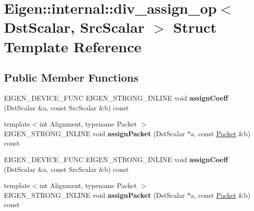 \hypertarget{struct_eigen_1_1internal_1_1div__assign__op}{}\section{Eigen\+:\+:internal\+:\+:div\+\_\+assign\+\_\+op$<$ Dst\+Scalar, Src\+Scalar $>$ Struct Template Reference}
\label{struct_eigen_1_1internal_1_1div__assign__op}
\subsection*{Public Member Functions}
\begin{DoxyCompactItemize}
\item 
\mbox{\label{struct_eigen_1_1internal_1_1div__assign__op_a66eda20f8694f3a1c87cd6b755ccd9fc}} 
E\+I\+G\+E\+N\+\_\+\+D\+E\+V\+I\+C\+E\+\_\+\+F\+U\+NC E\+I\+G\+E\+N\+\_\+\+S\+T\+R\+O\+N\+G\+\_\+\+I\+N\+L\+I\+NE void {\bfseries assign\+Coeff} (Dst\+Scalar \&a, const Src\+Scalar \&b) const
\item 
\mbox{\label{struct_eigen_1_1internal_1_1div__assign__op_ab402e9f7ccc414aeca72663a7a7a90c8}} 
{\footnotesize template$<$int Alignment, typename Packet $>$ }\\E\+I\+G\+E\+N\+\_\+\+S\+T\+R\+O\+N\+G\+\_\+\+I\+N\+L\+I\+NE void {\bfseries assign\+Packet} (Dst\+Scalar $\ast$a, const \hyperlink{union_eigen_1_1internal_1_1_packet}{Packet} \&b) const
\item 
\mbox{\label{struct_eigen_1_1internal_1_1div__assign__op_a66eda20f8694f3a1c87cd6b755ccd9fc}} 
E\+I\+G\+E\+N\+\_\+\+D\+E\+V\+I\+C\+E\+\_\+\+F\+U\+NC E\+I\+G\+E\+N\+\_\+\+S\+T\+R\+O\+N\+G\+\_\+\+I\+N\+L\+I\+NE void {\bfseries assign\+Coeff} (Dst\+Scalar \&a, const Src\+Scalar \&b) const
\item 
\mbox{\label{struct_eigen_1_1internal_1_1div__assign__op_ab402e9f7ccc414aeca72663a7a7a90c8}} 
{\footnotesize template$<$int Alignment, typename Packet $>$ }\\E\+I\+G\+E\+N\+\_\+\+S\+T\+R\+O\+N\+G\+\_\+\+I\+N\+L\+I\+NE void {\bfseries assign\+Packet} (Dst\+Scalar $\ast$a, const \hyperlink{union_eigen_1_1internal_1_1_packet}{Packet} \&b) const
\end{DoxyCompactItemize}


